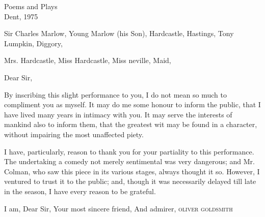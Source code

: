 \documentclass{book}
\begin{document}
              {Poems and Plays\\[1ex]Dent, 1975}

\pagestyle {empty}


\begin{versus}

 \Novus \textus \actor


Sir Charles Marlow,           
Young Marlow (his Son),       
Hardcastle,                   
Hastings,                     
Tony Lumpkin,                 
Diggory,                      


Mrs. Hardcastle,              
Miss Hardcastle,              
Miss neville,                 
Maid,                         

\end{versus}

\newpage
{}

Dear Sir,
\spatium {.5ex}

By inscribing this slight performance to you, I do not mean
so much to compliment you as myself.  It may do me some honour to
inform the public, that I have lived many years in intimacy with you. 
It may serve the interests of mankind also to inform them, that the
greatest wit may be found in a character, without impairing the most
unaffected piety.

\quad I have, particularly, reason to thank you for your
partiality to this performance. The undertaking a comedy not merely
sentimental was very dangerous; and Mr. Colman, who saw this piece in
its various stages, always thought it so. However, I ventured to trust
it to the public; and, though it was necessarily delayed till late in
the season, I have every reason to be grateful.

\spatium {.5ex}

\begin{versus}
\Forma {}
I am, Dear Sir,
Your most sincere friend,
And admirer,
\textsc{oliver goldsmith}
\end{versus}
\end{document}
